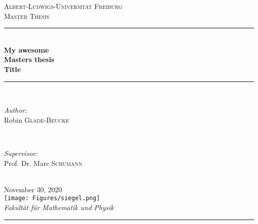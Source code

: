 \begin{titlepage}
\newcommand{\HRule}{\rule{\linewidth}{0.25mm}} %
\center
\textsc{\LARGE Albert-Ludwigs-Universit\"{a}t Freiburg}\\[1.5cm]
\textsc{\Large Master Thesis}\\[0.4cm]
\HRule \\[0.4cm]
\huge \textbf{My awesome}\\\textbf{Masters thesis}\\\textbf{Title}
\HRule \\[1.0cm]
\begin{minipage}{0.4\textwidth}
\begin{flushleft} \large
\emph{Author:}\\
Robin \textsc{Glade-Beucke} \\
\end{flushleft}
\end{minipage}
~
\begin{minipage}{0.4\textwidth}
\begin{flushright} \large
\emph{Supervisor:} \\
Prof. Dr. Marc \textsc{Schumann} \\
\end{flushright}
\end{minipage}\\[1cm]

{\large November 30, 2020}\\[0.8cm]

\texttt{[image: Figures/siegel.png]}\\[1cm]

\large \emph{Fakult\"{a}t f\"{u}r Mathematik und Physik}\\[0.4cm]

\HRule \\
\setcounter{page}{0}
\end{titlepage}

